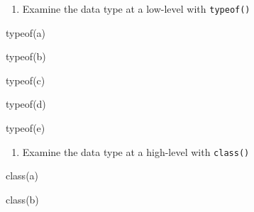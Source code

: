\documentclass[
  letterpaper,
  DIV=11,
  numbers=noendperiod]{scrreprt}
\newenvironment{Shaded}{}{}
\newcommand{\FunctionTok}[1]{\textcolor[rgb]{0.44,0.26,0.76}{#1}}
\newcommand{\NormalTok}[1]{\textcolor[rgb]{0.14,0.16,0.18}{#1}}
\providecommand{\tightlist}{%
  \setlength{\itemsep}{0pt}\setlength{\parskip}{0pt}}\usepackage{longtable,booktabs,array}
\begin{document}
\begin{enumerate}
\def\labelenumi{\arabic{enumi}.}
\tightlist
\item
  Examine the data type at a low-level with \texttt{typeof()}
\end{enumerate}

\begin{Shaded}
\begin{Highlighting}[]
\FunctionTok{typeof}\NormalTok{(a)}
\end{Highlighting}
\end{Shaded}

\begin{Shaded}
\begin{Highlighting}[]
\FunctionTok{typeof}\NormalTok{(b)}
\end{Highlighting}
\end{Shaded}

\begin{Shaded}
\begin{Highlighting}[]
\FunctionTok{typeof}\NormalTok{(c)}
\end{Highlighting}
\end{Shaded}

\begin{Shaded}
\begin{Highlighting}[]
\FunctionTok{typeof}\NormalTok{(d)}
\end{Highlighting}
\end{Shaded}

\begin{Shaded}
\begin{Highlighting}[]
\FunctionTok{typeof}\NormalTok{(e)}
\end{Highlighting}
\end{Shaded}

\begin{enumerate}
\def\labelenumi{\arabic{enumi}.}
\setcounter{enumi}{1}
\tightlist
\item
  Examine the data type at a high-level with \texttt{class()}
\end{enumerate}

\begin{Shaded}
\begin{Highlighting}[]
\FunctionTok{class}\NormalTok{(a)}
\end{Highlighting}
\end{Shaded}

\begin{Shaded}
\begin{Highlighting}[]
\FunctionTok{class}\NormalTok{(b)}
\end{Highlighting}
\end{Shaded}
\end{document}
